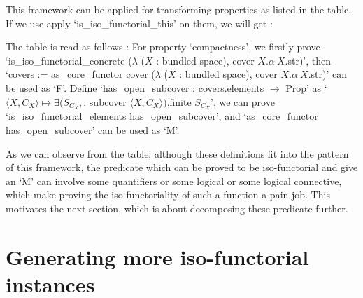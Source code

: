 \documentclass[11pt]{article}
\begin{document}
This framework can be applied for transforming properties as listed in the table. If we use apply `is\_iso\_functorial\_this' on them, we will get :


The table is read as follows : For property `compactness', we firstly prove `is\_iso\_functorial\_concrete ($\lambda$ ($X$ : bundled space), cover $X.\alpha \ X$.str)', then `covers := as\_core\_functor cover ($\lambda$ ($X$ : bundled space), cover $X.\alpha \ X$.str)' can be used as `F'. Define `has\_open\_subcover : covers.elements $\to$ Prop' as `$\langle X,C_X\rangle \mapsto\exists (S_{C_X},$: subcover $\langle X,C_X\rangle)$,finite $S_{C_X}$', we can prove `is\_iso\_functorial\_elements has\_open\_subcover', and `as\_core\_functor has\_open\_subcover' can be used as `M'.

As we can observe from the table, although these definitions fit into the pattern of this framework, the predicate which can be proved to be iso-functorial and give an `M' can involve some quantifiers or some logical or some logical connective, which make proving the iso-functoriality of such a function a pain job. This motivates the next section, which is about decomposing these predicate further.

\section{Generating more iso-functorial instances}
\end{document}

